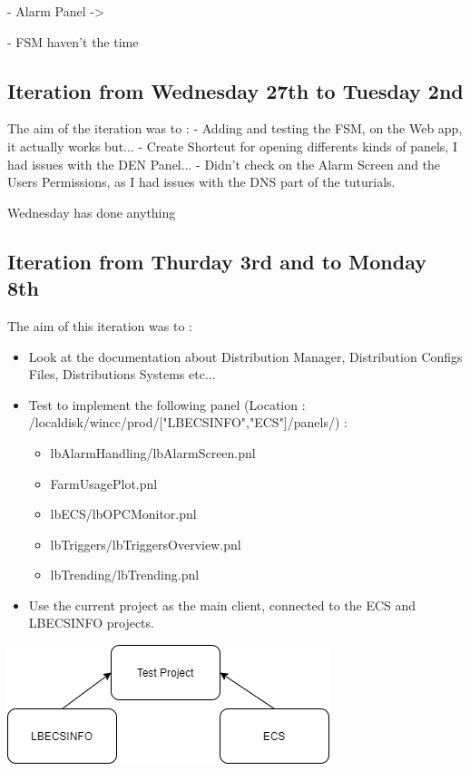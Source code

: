 \documentclass[a4paper, 10pt]{article}
\begin{document}
        - Alarm Panel -> 

        - FSM haven't the time

\subsection*{Iteration from Wednesday 27th to Tuesday 2nd}
The aim of the iteration was to :
    - Adding and testing the FSM, on the Web app, it actually works but...
    - Create Shortcut for opening differents kinds of panels, I had issues with the DEN Panel...
    - Didn't check on the Alarm Screen and the Users Permissions, as I had issues with the DNS part of the tuturials.

Wednesday has done anything

\subsection*{Iteration from Thurday 3rd and to Monday 8th}
The aim of this iteration was to :
\begin{itemize}
    \item Look at the documentation about Distribution Manager, Distribution Configs Files, Distributions Systems etc...
    \item Test to implement the following panel (Location : /localdisk/wincc/prod/["LBECSINFO","ECS"]/panels/) : 
    \begin{itemize}
        \item lbAlarmHandling/lbAlarmScreen.pnl
        \item FarmUsagePlot.pnl
        \item lbECS/lbOPCMonitor.pnl
        \item lbTriggers/lbTriggersOverview.pnl
        \item lbTrending/lbTrending.pnl
    \end{itemize}
    \item Use the current project as the main client, connected to the ECS and LBECSINFO projects.
\end{itemize}
\begin{center}
    \includegraphics[scale = 0.5]{images/subsystem.png}
\end{center}
\end{document}
